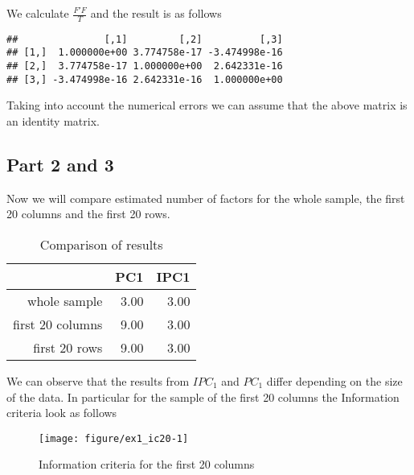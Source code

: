 \documentclass[12pt, a4paper]{article}\usepackage[]{graphicx}\usepackage[]{color}
\makeatletter
\def\maxwidth{ %
  \ifdim\Gin@nat@width>\linewidth
    \linewidth
  \else
    \Gin@nat@width
  \fi
}
\newenvironment{kframe}{%
 \def\at@end@of@kframe{}%
 \ifinner\ifhmode%
  \def\at@end@of@kframe{\end{minipage}}%
  \begin{minipage}{\columnwidth}%
 \fi\fi%
 \def\FrameCommand##1{\hskip\@totalleftmargin \hskip-\fboxsep
 \colorbox{shadecolor}{##1}\hskip-\fboxsep
     \hskip-\linewidth \hskip-\@totalleftmargin \hskip\columnwidth}%
 \MakeFramed {\advance\hsize-\width
   \@totalleftmargin\z@ \linewidth\hsize
   \@setminipage}}%
 {\par\unskip\endMakeFramed%
 \at@end@of@kframe}
\newenvironment{knitrout}{}{} %
\makeatother
\begin{document}
We calculate $\frac{F'F}{T}$ and the result is as follows
\begin{knitrout}
\color{fgcolor}\begin{kframe}
\begin{verbatim}
##               [,1]         [,2]          [,3]
## [1,]  1.000000e+00 3.774758e-17 -3.474998e-16
## [2,]  3.774758e-17 1.000000e+00  2.642331e-16
## [3,] -3.474998e-16 2.642331e-16  1.000000e+00
\end{verbatim}
\end{kframe}
\end{knitrout}
Taking into account the numerical errors we can assume that the above matrix is an identity matrix.




\subsection{Part 2 and 3}

Now we will compare estimated number of factors for the whole sample, the first 20 columns and the first 20 rows.
\begin{table}[H]
\centering
\begin{tabular}{rrr}
  \hline
  & PC1 & IPC1 \\ 
  \hline
whole sample & 3.00 & 3.00 \\ 
  first 20 columns & 9.00 & 3.00 \\ 
  first 20 rows & 9.00 & 3.00 \\ 
   \hline
\end{tabular}
\caption{Comparison of results} 
\label{tab:por}
\end{table}


We can observe that the results from $IPC_1$ and $PC_1$ differ depending on the size of the data.
In particular for the sample of the first 20 columns the Information criteria look as follows

\begin{knitrout}
\color{fgcolor}\begin{figure}[H]

{\centering \texttt{[image: figure/ex1\_ic20-1]} 

}

\caption[Information criteria for the first 20 columns]{Information criteria for the first 20 columns}\label{fig:ex1.ic20}
\end{figure}


\end{knitrout}
\end{document}
